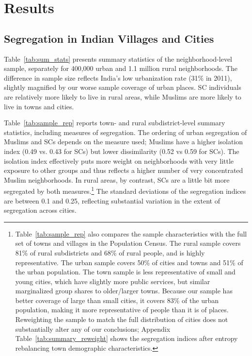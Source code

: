 \documentclass[12pt]{article}
\begin{document}
\section{Results} \label{sec:result}

\subsection{Segregation in Indian Villages and Cities}
\label{sec:res_seg}

Table~\ref{tab:sum_stats} presents summary statistics of the neighborhood-level sample, separately for 400,000 urban and 1.1 million rural neighborhoods. The difference in sample size reflects India's low urbanization rate (31\% in 2011), slightly magnified by our worse sample coverage of urban places. SC individuals are relatively more likely to live in rural areas, while Muslims are more likely to live in towns and cities.

Table~\ref{tab:sample_rep} reports town- and rural subdistrict-level summary statistics, including measures of segregation. The ordering of urban segregation of Muslims and SCs depends on the measure used; Muslims have a higher isolation index (0.49 vs. 0.43 for SCs) but lower dissimilarity (0.52 vs 0.59 for SCs). The isolation index effectively puts more weight on neighborhoods with very little exposure to other groups and thus reflects a higher number of very concentrated Muslim neighborhoods. In rural areas, by contrast, SCs are a little bit more segregated by both measures.\footnote{Table~\ref{tab:sample_rep} also compares the sample characteristics with the full set of towns and villages in the Population Census. The rural sample covers 81\% of rural subdistricts and 68\% of rural people, and is highly representative. The urban sample covers 50\% of cities and towns and 51\% of the urban population. The town sample is less representative of small and young cities, which have slightly more public services, but similar marginalized group shares to older/larger towns. Because our sample has better coverage of large than small cities, it covers 83\% of the urban population, making it more representative of people than it is of places. Reweighting the sample to match the full distribution of cities does not substantially alter any of our conclusions; Appendix Table~\ref{tab:summary_reweight} shows the segregation indices after entropy rebalancing town demographic characteristics.} The standard deviations of the segregation indices are between 0.1 and 0.25, reflecting substantial variation in the extent of segregation across cities.
\end{document}
